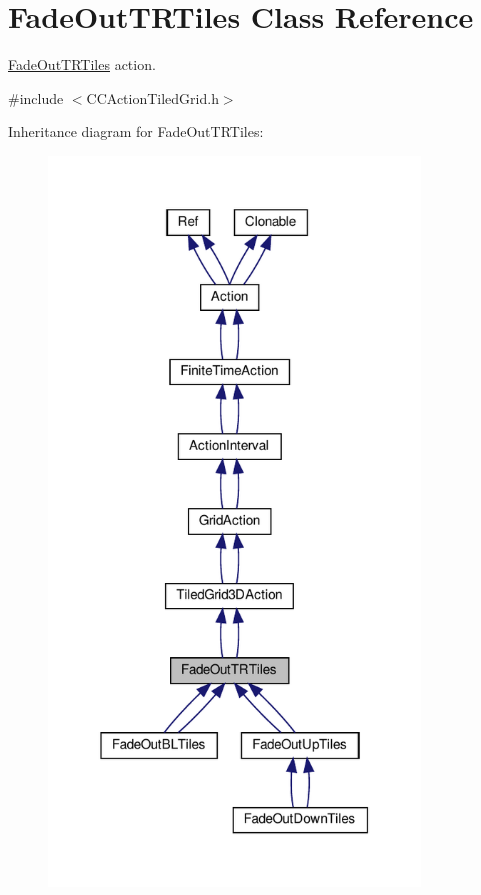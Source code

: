 \hypertarget{classFadeOutTRTiles}{}\section{Fade\+Out\+T\+R\+Tiles Class Reference}
\label{classFadeOutTRTiles}


\hyperlink{classFadeOutTRTiles}{Fade\+Out\+T\+R\+Tiles} action.  




{\ttfamily \#include $<$C\+C\+Action\+Tiled\+Grid.\+h$>$}



Inheritance diagram for Fade\+Out\+T\+R\+Tiles\+:
\nopagebreak
\begin{figure}[H]
\begin{center}
\leavevmode
\includegraphics[width=280pt]{classFadeOutTRTiles__inherit__graph}
\end{center}
\end{figure}


